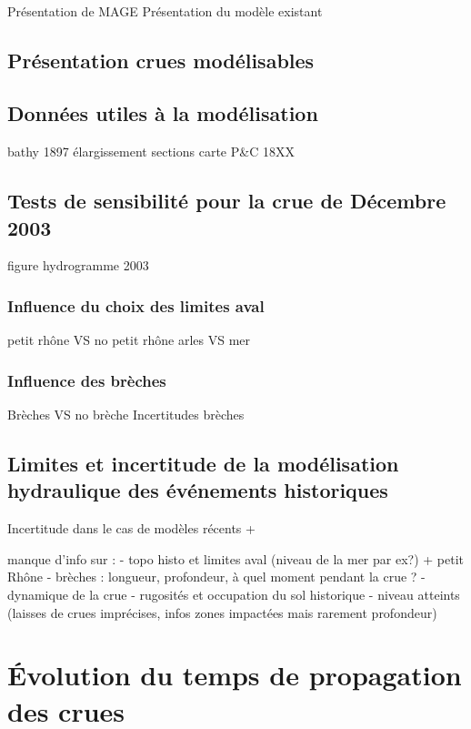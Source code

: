 \documentclass[11pt]{article}
\begin{document}
	 
	\paragraph{} 
	Présentation de MAGE
	Présentation du modèle existant
	
	
	\subsection{Présentation crues modélisables}
	
	
	
	\subsection{Données utiles à la modélisation}
	bathy 1897
	élargissement sections
	carte P\&C 18XX
	
	\subsection{Tests de sensibilité pour la crue de Décembre 2003}
	figure hydrogramme 2003
	
		\subsubsection{Influence du choix des limites aval}
		petit rhône VS no petit rhône
		arles VS mer
		
		
		\subsubsection{Influence des brèches}
		Brèches VS no brèche
		Incertitudes brèches
		
	\subsection{Limites et incertitude de la modélisation hydraulique des événements historiques}
Incertitude dans le cas de modèles récents +	
	
	manque d'info sur : 
	- topo histo et limites aval (niveau de la mer par ex?) + petit Rhône
	- brèches : longueur, profondeur, à quel moment pendant la crue ? 
	- dynamique de la crue
	- rugosités et occupation du sol historique
	- niveau atteints (laisses de crues imprécises, infos zones impactées mais rarement profondeur)
	
\section{Évolution du temps de propagation des crues}
\end{document}
